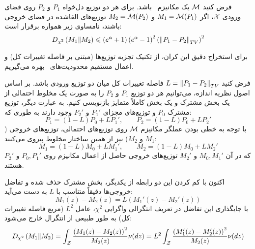 \begin{قضیه}
\label{thm:chi-squared-contraction}
فرض کنید $\mech$ یک مکانیزم \LDP\ باشد. برای هر دو توزیع دل‌خواه $P_1$ و $P_2$ روی فضای ورودی $\Xset$، اگر $M_1 = \mech(P_1)$ و $M_2 = \mech(P_2)$ توزیع‌های القاشده در فضای خروجی باشند، نامساوی زیر همواره برقرار است:
\begin{equation}
\label{eq:chi-sq-bound}
D_{\chi^2}\left(M_1 \| M_2\right) \leqslant \left(e^{\alpha} + 1\right)\left(e^{\alpha} - 1\right)^2 \left(\left\lVert P_1 - P_2\right\rVert_{TV}\right)^2
\end{equation}
\end{قضیه}
\begin{اثبات}
برای استخراج دقیق این کران، از تکنیک تجزیه توزیع‌ها (مبتنی بر فاصله تغییرات کل) و اعمال مستقیم محدودیت‌های \LDP\ بهره می‌گیریم. 

فرض کنید $L = \left\lVert P_1 - P_2\right\rVert_{TV}$ فاصله تغییرات کل میان دو توزیع ورودی باشد. بر اساس اصول نظریه اندازه، می‌توانیم هر دو توزیع $P_1$ و $P_2$ را به صورت یک مخلوط احتمالی از یک بخش مشترک و یک بخش کاملاً متمایز بازنویسی کنیم. به عبارت دیگر، توزیع مشترک $P_0$ و توزیع‌های مجزای $P_1'$ و $P_2'$ وجود دارند به طوری که:
\begin{equation}
P_1 = (1 - L) P_0 + L P_1', \qquad P_2 = (1 - L) P_0 + L P_2'
\end{equation}
با توجه به خطی بودن عملگر مکانیزم $\mech$ روی توزیع‌های احتمالی، توزیع‌های خروجی ($M_1$ و $M_2$) نیز از همین ساختار مخلوط پیروی می‌کنند:
\begin{equation}
M_1 = (1 - L) M_0 + L M_1', \qquad M_2 = (1 - L) M_0 + L M_2'
\end{equation}
که در آن $M_0, M_1'$ و $M_2'$ توزیع‌های خروجی حاصل از اعمال مکانیزم روی $P_0, P_1'$ و $P_2'$ هستند. 

اکنون با کم کردن این دو رابطه از یکدیگر، بخش مشترک حذف شده و تفاضل خروجی‌ها دقیقاً متناسب با $L$ به دست می‌آید:
\begin{equation}
M_1(z) - M_2(z) = L \left( M_1'(z) - M_2'(z) \right)
\end{equation}
با جایگذاری این تفاضل در تعریف انتگرالی واگرایی $\chi^2$، عامل $L^2$ (مربع فاصله تغییرات کل) به طور طبیعی از انتگرال خارج می‌شود:
\begin{equation}
\label{eq:chi-sq-step1}
D_{\chi^2}\left(M_1 \| M_2\right) = \int_{\Zset} \frac{\left( M_1(z) - M_2(z) \right)^2}{M_2(z)} \nu(dz) = L^2 \int_{\Zset} \frac{\left( M_1'(z) - M_2'(z) \right)^2}{M_2(z)} \nu(dz)
\end{equation}


\end{اثبات}
